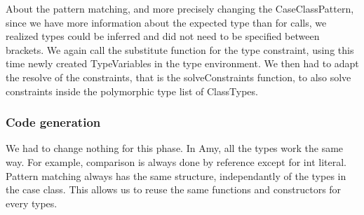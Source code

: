 About the pattern matching, and more precisely changing the CaseClassPattern, since we have more information about the expected type than for calls, we realized types could be inferred and did not need to be specified between brackets. We again call the substitute function for the type constraint, using this time newly created TypeVariables in the type environment. We then had to adapt the resolve of the constraints, that is the solveConstraints function, to also solve constraints inside the polymorphic type list of ClassTypes.
\subsubsection{Code generation}
We had to change nothing for this phase. In Amy, all the types work the same way. For example, comparison is always done by reference except for int literal. Pattern matching always has the same structure, independantly of the types in the case class. This allows us to reuse the same functions and constructors for every types.
